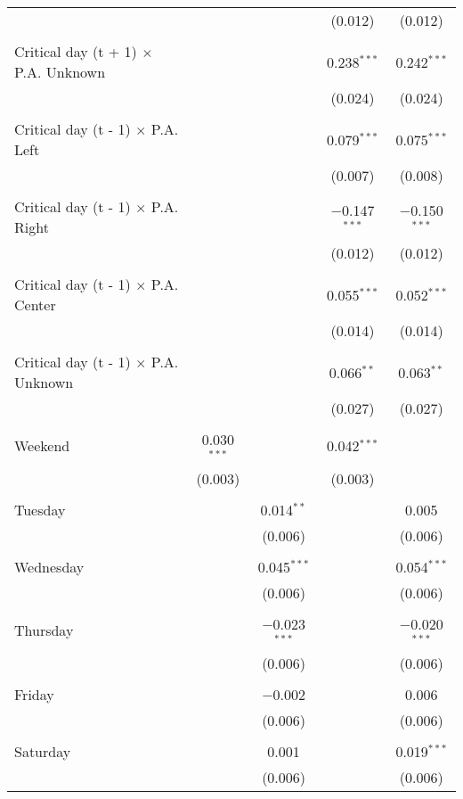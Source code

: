 \documentclass[
]{article}
\begin{document}
\begin{table}[!htbp]
{\begin{tabular}{@{\extracolsep{5pt}}lcccc}
  &  &  & (0.012) & (0.012) \\ 
  & & & & \\ 
 Critical day (t + 1) $\times$ P.A. Unknown &  &  & 0.238$^{***}$ & 0.242$^{***}$ \\ 
  &  &  & (0.024) & (0.024) \\ 
  & & & & \\ 
 Critical day (t - 1) $\times$ P.A. Left &  &  & 0.079$^{***}$ & 0.075$^{***}$ \\ 
  &  &  & (0.007) & (0.008) \\ 
  & & & & \\ 
 Critical day (t - 1) $\times$ P.A. Right &  &  & $-$0.147$^{***}$ & $-$0.150$^{***}$ \\ 
  &  &  & (0.012) & (0.012) \\ 
  & & & & \\ 
 Critical day (t - 1) $\times$ P.A. Center &  &  & 0.055$^{***}$ & 0.052$^{***}$ \\ 
  &  &  & (0.014) & (0.014) \\ 
  & & & & \\ 
 Critical day (t - 1) $\times$ P.A. Unknown &  &  & 0.066$^{**}$ & 0.063$^{**}$ \\ 
  &  &  & (0.027) & (0.027) \\ 
  & & & & \\ 
 Weekend & 0.030$^{***}$ &  & 0.042$^{***}$ &  \\ 
  & (0.003) &  & (0.003) &  \\ 
  & & & & \\ 
 Tuesday &  & 0.014$^{**}$ &  & 0.005 \\ 
  &  & (0.006) &  & (0.006) \\ 
  & & & & \\ 
 Wednesday &  & 0.045$^{***}$ &  & 0.054$^{***}$ \\ 
  &  & (0.006) &  & (0.006) \\ 
  & & & & \\ 
 Thursday &  & $-$0.023$^{***}$ &  & $-$0.020$^{***}$ \\ 
  &  & (0.006) &  & (0.006) \\ 
  & & & & \\ 
 Friday &  & $-$0.002 &  & 0.006 \\ 
  &  & (0.006) &  & (0.006) \\ 
  & & & & \\ 
 Saturday &  & 0.001 &  & 0.019$^{***}$ \\ 
  &  & (0.006) &  & (0.006) \\ 

\end{tabular}}
\end{table}
\end{document}
